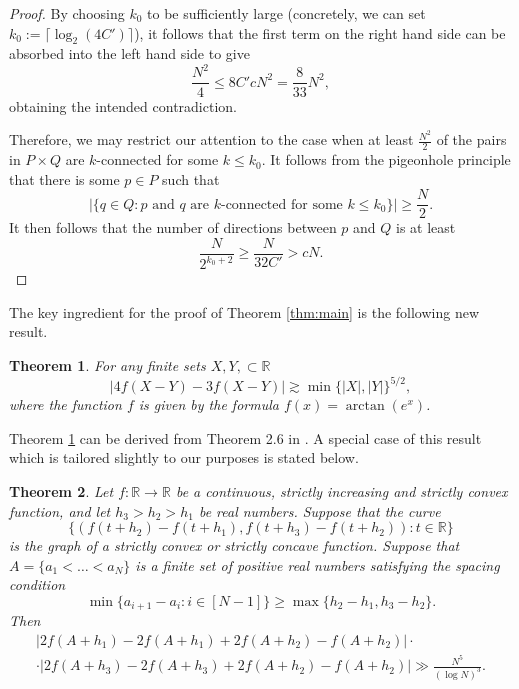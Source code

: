 \documentclass[11pt,oneside]{amsart}
\numberwithin{exercise}{subsection}
\newtheorem{theorem}{Theorem}
\begin{document}
\begin{proof}
    By choosing $k_0$ to be sufficiently large (concretely, we can set $k_0 := \lceil \log_2(4C') \rceil $), it follows that the first term on the right hand side can be absorbed into the left hand side to give
    \[
    \frac{N^2}{4} \leq 8C'cN^2 =\frac{8}{33}N^2,
    \]
    obtaining the intended contradiction.

    Therefore, we may restrict our attention to the case when at least $\frac{N^2}{2}$ of the pairs in $P \times Q$ are $k$-connected for some $k \leq k_0$. It follows from the pigeonhole principle that there is some $p \in P$ such that
    \[
    |\{ q \in Q : \text{$p$ and $q$ are $k$-connected for some $k \leq k_0$} \}| \geq \frac{N}{2}.
    \]
    It then follows that the number of directions between $p$ and $Q$ is at least
    \[
    \frac{N}{2^{k_0+2}} \geq \frac{N}{32C'} > cN.
    \] 
\end{proof}

The key ingredient for the proof of Theorem \ref{thm:main} is the following new result. \begin{theorem} \label{thm:key}
For any finite sets $X,Y, \subset \mathbb R$
\[
|4f(X-Y) - 3f(X-Y)| \gtrsim \min \{ |X|,|Y| \}^{5/2},
\]
where the function $f$ is given by the formula $f(x)=\arctan(e^x)$.
\end{theorem}

Theorem \ref{thm:key} can be derived from Theorem 2.6 in \cite{HRNS}. A special case of this result which is tailored slightly to our purposes is stated below.


\begin{theorem}\label{thm:MainExpander}
Let $f: \mathbb R\to\mathbb R$ be a continuous, strictly increasing and strictly convex function, and let $h_3>h_2>h_1$ be real numbers. Suppose that the curve
\begin{equation} \label{impy}
 \{(f(t+h_2)-f(t+h_1),f(t+h_3)-f(t+h_2)) : t\in \mathbb R\}
\end{equation}
is the graph of a strictly convex or strictly concave function.  Suppose that $A=\{a_1<\ldots<a_N\}$ is a finite set of positive real numbers satisfying the spacing condition
\[
\min\{a_{i+1}-a_i:i\in[N-1]\}\geq \max\{h_2-h_1, h_3-h_2\}.
\] 
Then
\begin{multline*}|2f(A+h_1)-2f(A+h_1)+2f(A+h_2)-f(A+h_2)|\cdot\\\cdot|2f(A+h_3)-2f(A+h_3)+2f(A+h_2)-f(A+h_2)| \gg \frac{N^5}{(\log N)^3}.
\end{multline*}
\end{theorem}
\end{document}
